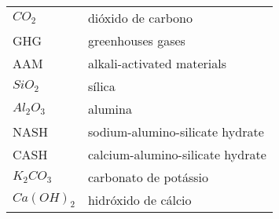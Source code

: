\begin{longtable}{ll}
$CO_2$ & dióxido de carbono \\
GHG & greenhouses gases \\
AAM & alkali-activated materials \\
$ SiO_2$ & sílica \\
$ Al_2O_3$ & alumina \\
NASH & sodium-alumino-silicate hydrate \\
CASH & calcium-alumino-silicate hydrate \\
$K_2CO_3$ & carbonato de potássio \\
$Ca(OH)_2$ & hidróxido de cálcio \\

\end{longtable}

